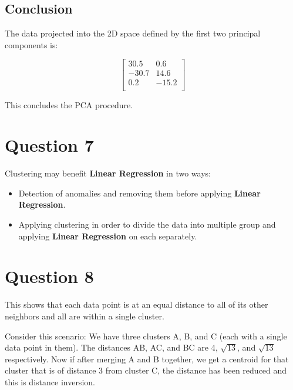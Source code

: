 \documentclass[a4paper,12pt]{article}
\begin{document}
\subsection*{Conclusion}

The data projected into the 2D space defined by the first two principal components is:

\[
\begin{bmatrix}
30.5 & 0.6 \\
-30.7 & 14.6 \\
0.2 & -15.2 \\
\end{bmatrix}
\]

This concludes the PCA procedure.

\section*{Question 7}
Clustering may benefit \textbf{Linear Regression} in two ways:
\begin{itemize}
    \item Detection of anomalies and removing them before applying \textbf{Linear Regression}.
    \item Applying clustering in order to divide the data into multiple group and applying \textbf{Linear Regression} on each separately.
\end{itemize}

\section*{Question 8}
This shows that each data point is at an equal distance to all of its other neighbors and all are within a single cluster.

Consider this scenario: We have three clusters A, B, and C (each with a single data point in them). The distances AB, AC, and BC are 4, $\sqrt{13}$, and $\sqrt{13}$ respectively. Now if after merging A and B together, we get a centroid for that cluster that is of distance 3 from cluster C, the distance has been reduced and this is distance inversion.
\end{document}
